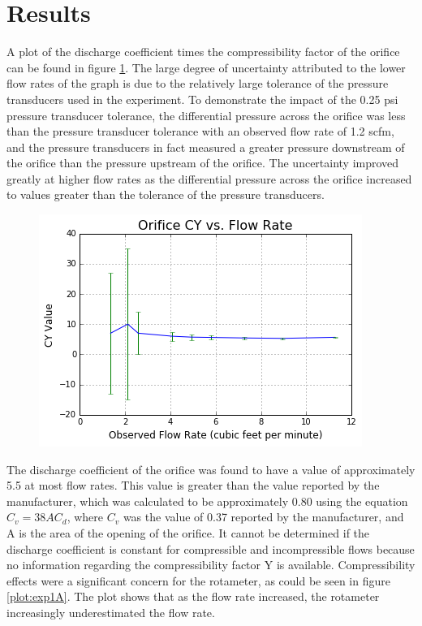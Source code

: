 \documentclass[paper=letter, fontsize=10pt]{scrartcl} %
\begin{document}
\section{Results}
A plot of the discharge coefficient times the compressibility factor of the orifice can be found in figure \ref{plot:exp1}.  The large degree of uncertainty attributed to the lower flow rates of the graph is due to the relatively large tolerance of the pressure transducers used in the experiment.  To demonstrate the impact of the 0.25 psi pressure transducer tolerance, the differential pressure across the orifice was less than the pressure transducer tolerance with an observed flow rate of 1.2 scfm, and the pressure transducers in fact measured a greater pressure downstream of the orifice than the pressure upstream of the orifice.  The uncertainty improved greatly at higher flow rates as the differential pressure across the orifice increased to values greater than the tolerance of the pressure transducers.

\begin{figure}[!h]\label{plot:exp1}
\includegraphics[scale=0.6]{Lab1FigureCY}
\centering
\end{figure}

The discharge coefficient of the orifice was found to have a value of approximately 5.5 at most flow rates.  This value is greater than the value reported by the manufacturer, which was calculated to be approximately 0.80 using the equation \(C_v = 38 A C_d\), where \(C_v\) was the value of 0.37 reported by the manufacturer, and A is the area of the opening of the orifice.  It cannot be determined if the discharge coefficient is constant for compressible and incompressible flows because no information regarding the compressibility factor Y is available.
\newline
\newline
Compressibility effects were a significant concern for the rotameter, as could be seen in figure \ref{plot:exp1A}.  The plot shows that as the flow rate increased, the rotameter increasingly underestimated the flow rate.
\end{document}
